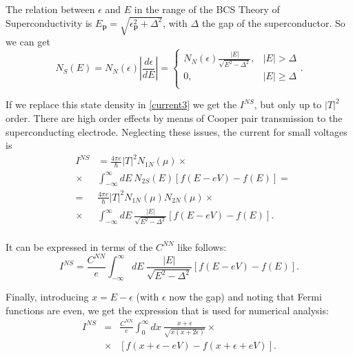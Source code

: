 \documentclass[twocolumn, twoside,a4paper,10pt]{article}
\begin{document}
The relation between $\epsilon$ and $E$ in the range of the BCS Theory of Superconductivity is $E_{\mathbf{p}} = \sqrt{\epsilon_{\mathbf{p}}^2 + \Delta^2}$, with $\Delta$ the gap of the superconductor. So we can get
\begin{equation}\label{ns}
N_S(E) = N_N(\epsilon) \left | \frac{d\epsilon}{dE} \right | =  
\left\{ 
\begin{array}{ll} 
N_N(\epsilon)\frac{|E|}{\sqrt{E^2-\Delta^2}},	&	|E| > \Delta 	\\ 
0,								& 	|E| \geq \Delta	\\
\end{array}
\right..
\end{equation}

If we replace this state density in \eqref{current3} we get the $I^{NS}$, but only up to $|T|^2$ order. There are high order effects by means of Cooper pair transmission to the superconducting electrode. Neglecting these issues, the current for small voltages is
\begin{eqnarray}\label{ins_previous}
&I^{NS}& = \frac{4\pi e}{\hbar} |T|^2 N_{1N}(\mu) \times
		\nonumber \\
		&\times& \int_{-\infty}^{\infty} dE\ N_{2S}(E) [f(E-eV)-f(E)] =
		\nonumber \\
		&=& \frac{4\pi e}{\hbar} |T|^2 N_{1N}(\mu) N_{2N}(\mu) \times
		\nonumber \\
		&\times& \int_{-\infty}^{\infty} dE\ \frac{|E|}{\sqrt{E^2-\Delta^2}} [f(E-eV)-f(E)].
		\nonumber \\
\end{eqnarray}

It can be expressed in terms of the $C^{NN}$ like follows:
\begin{equation}\label{ins}
I^{NS} = \frac{C^{NN}}{e} \int_{-\infty}^{\infty} dE\ \frac{|E|}{\sqrt{E^2-\Delta^2}} [f(E-eV)-f(E)].
\end{equation}

Finally, introducing $x=E-\epsilon$ (with $\epsilon$ now the gap) and noting that Fermi functions are even, we get the expression that is used for numerical analysis:
\begin{eqnarray}\label{ins_numerical}
I^{NS} &=& \frac{C^{NN}}{e} \int_{0}^{\infty} dx\ \frac{x+\epsilon}{\sqrt{x(x+2\epsilon)}} \times
		\nonumber \\
		&\times& [f(x+\epsilon-eV)-f(x+\epsilon+eV)].
		\nonumber \\
\end{eqnarray}
\end{document}
